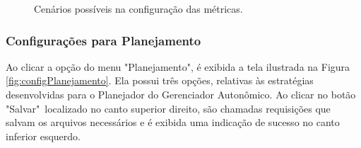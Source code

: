 \documentclass[portugues]{ic-tese}
\begin{document}
\begin{figure}[H]
    \centering
    \caption{Cenários possíveis na configuração das métricas.}
    \label{fig:cenariosMetricas}
\end{figure}

\subsubsection{Configurações para Planejamento}

Ao clicar a opção do menu "Planejamento", é exibida a tela ilustrada na Figura \ref{fig:configPlanejamento}. Ela possui três opções, relativas às estratégias desenvolvidas para o Planejador do Gerenciador Autonômico. Ao clicar no botão "Salvar"~localizado no canto superior direito, são chamadas requisições que salvam os arquivos necessários e é exibida uma indicação de sucesso no canto inferior esquerdo.
\end{document}
